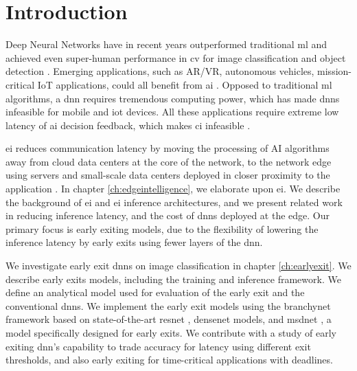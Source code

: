 
\hypertarget{introduction}{%
	\chapter{Introduction}\label{ch:introduction}}

Deep Neural Networks have in recent years outperformed traditional \gls{ml} and achieved even super-human performance in \gls{cv} for image classification and object detection \cite{russakovsky_imagenet_2015}. Emerging applications, such as AR/VR, autonomous vehicles, mission-critical IoT applications, could all benefit from \gls{ai} \cite{pettey_immersive_2018}. Opposed to traditional \gls{ml} algorithms, a \gls{dnn} requires tremendous computing power, which has made \gls{dnn}s infeasible for mobile and \gls{iot} devices. All these applications require extreme low latency of \gls{ai} decision feedback, which makes \gls{ci} infeasible \cite{zhou_edge_2019}. 

\acrlong{ei} reduces communication latency by moving the processing of AI algorithms away from cloud data centers at the core of the network, to the network edge using servers and small-scale data centers deployed in closer proximity to the application \cite{shi_edge_2016}. In chapter \ref{ch:edgeintelligence}, we elaborate upon \gls{ei}. We describe the background of \gls{ei} and \gls{ei} inference architectures, and we present related work in reducing inference latency, and the cost of \gls{dnn}s deployed at the edge. Our primary focus is early exiting models, due to the flexibility of lowering the inference latency by early exits using fewer layers of the \gls{dnn}.

We investigate early exit \gls{dnn}s on image classification in chapter \ref{ch:earlyexit}. We describe early exits models, including the training and inference framework. We define an analytical model used for evaluation of the early exit and the conventional \gls{dnn}s. We implement the early exit models using the \gls{branchynet} framework \cite{teerapittayanon_branchynet:_2016} based on state-of-the-art \gls{resnet} \cite{he_deep_2015}, \gls{densenet} \cite{huang_densely_2016} models, and \gls{msdnet} \cite{huang_multi-scale_2017}, a model specifically designed for early exits. We contribute with a study of early exiting \gls{dnn}'s capability to trade accuracy for latency using different exit thresholds, and also early exiting for time-critical applications with deadlines.

